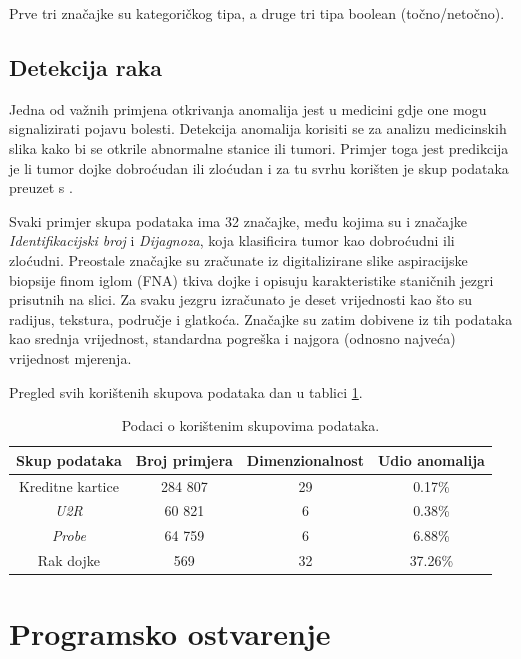 \documentclass[utf8, diplomski, numeric]{fer}
\begin{document}
Prve tri značajke su kategoričkog tipa, a druge tri tipa boolean (točno/netočno).

\section{Detekcija raka}
Jedna od važnih primjena otkrivanja anomalija jest u medicini gdje one mogu signalizirati pojavu bolesti. Detekcija anomalija korisiti se za analizu medicinskih slika kako bi se otkrile abnormalne stanice ili tumori. Primjer toga jest predikcija je li tumor dojke dobroćudan ili zloćudan i za tu svrhu korišten je skup podataka preuzet s \cite{Dua:2019}.

Svaki primjer skupa podataka ima 32 značajke, među kojima su i značajke \textit{Identifikacijski broj} i \textit{Dijagnoza}, koja klasificira tumor kao dobroćudni ili zloćudni. Preostale značajke su zračunate iz digitalizirane slike aspiracijske biopsije finom iglom (FNA) tkiva dojke i opisuju karakteristike staničnih jezgri prisutnih na slici. Za svaku jezgru izračunato je deset vrijednosti kao što su radijus, tekstura, područje i glatkoća. Značajke su zatim dobivene iz tih podataka kao srednja vrijednost, standardna pogreška i najgora (odnosno najveća) vrijednost mjerenja. 

Pregled svih korištenih skupova podataka dan u tablici \ref{tab:datasets}.

\begin{table}[h!]
  \begin{center}
    \caption{Podaci o korištenim skupovima podataka.}
    \label{tab:datasets}
    \begin{tabular}{c|c|c|c} 
      \textbf{Skup podataka} & \textbf{Broj primjera} & \textbf{Dimenzionalnost}  & \textbf{Udio anomalija}\\
      \hline
      Kreditne kartice & 284 807 & 29 & 0.17\% \\
      \textit{U2R} & 60 821 & 6 & 0.38\% \\
      \textit{Probe} & 64 759 & 6 & 6.88\% \\
      Rak dojke & 569& 32 & 37.26\% \\
     \end{tabular}
  \end{center}
\end{table}


\chapter{Programsko ostvarenje} \label{ch:fifth}
\end{document}
